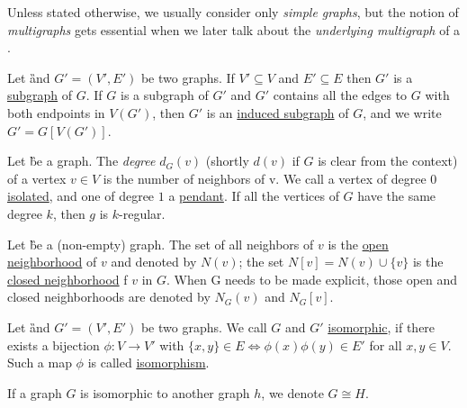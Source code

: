 Unless stated otherwise, we usually consider only \textit{simple graphs}, but the notion of \textit{multigraphs} gets essential when we later talk about the \textit{underlying multigraph} of a \dreg. 

\begin{definition}
    Let \G and $G' = (V', E')$ be two graphs. If $V' \subseteq V$ and $E' \subseteq E$ then $G'$ is a \underline{subgraph} of $G$. 
    If $G$ is a subgraph of $G'$ and $G'$ contains all the edges to $G$ with both endpoints in $V(G')$, then $G'$ is an \underline{induced subgraph} of $G$, and we write $G' = G[V(G')]$.
\end{definition}

\begin{definition}[Degrees]
    Let \G be a graph. The \textit{degree} $d_G(v)$ (shortly $d(v)$ if $G$ is clear from the context) of a vertex $v \in V$ is the number of neighbors of v. 
    We call a vertex of degree $0$ \underline{isolated}, and one of degree $1$ a \underline{pendant}. 
    If all the vertices of $G$ have the same degree $k$, then $g$ is $k$-regular.
\end{definition}

\begin{definition}
    Let \G be a (non-empty) graph. 
    The set of all neighbors of $v$ is the \underline{open neighborhood} of $v$ and denoted by $N(v)$; the set $N[v] = N(v) \cup \{v\}$ is the \underline{closed neighborhood} f $v$ in $G$. When G needs to be made explicit, those open and closed neighborhoods are denoted by $N_G(v)$ and $N_G[v]$. 
\end{definition}

\begin{definition}
Let \G and $G' = (V', E')$ be two graphs. We call $G$ and $G'$ \underline{isomorphic}, if there exists a bijection $\phi: V \rightarrow V'$ with $\{x, y\} \in E \Leftrightarrow \phi(x)\phi(y) \in E'$ for all  $x,y \in V$. Such a map $\phi$ is called \underline{isomorphism}.

If a graph $G$ is isomorphic to another graph $h$, we denote $G \cong H$. 
\end{definition}

